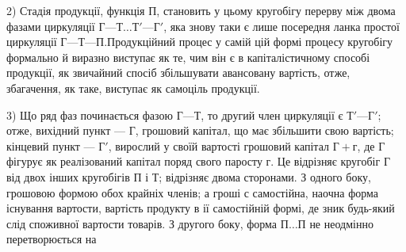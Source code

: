 2) Стадія продукції, функція П, становить у цьому кругобігу перерву
між двома фазами циркуляції $Г — Т\dots{} Т' — Г'$, яка знову таки є лише
посередня ланка простої циркуляції $Г — Т — П. П$родукційний процес у
самій цій формі процесу кругобігу формально й виразно виступає як
те, чим він є в капіталістичному способі продукції, як звичайний спосіб
збільшувати авансовану вартість, отже, збагачення, як таке, виступає як
самоціль продукції.

3) Що ряд фаз починається фазою $Г — Т$, то другий член циркуляції
є $Т' — Г'$; отже, вихідний пункт — Г, грошовий капітал, що має збільшити
свою вартість; кінцевий пункт — $Г'$, вирослий у своїй вартості грошовий
капітал $Г + г$, де Г фігурує як реалізований капітал поряд свого
паросту г. Це відрізняє кругобіг Г від двох інших кругобігів П і Т; відрізняє
двома сторонами. З одного боку, грошовою формою обох крайніх членів;
а гроші с самостійна, наочна форма існування вартости, вартість продукту
в ії самостійній формі, де зник будь-який слід споживної вартости
товарів. З другого боку, форма $П\dots{} П$ не неодмінно перетворюється на
\parbreak{}  %
